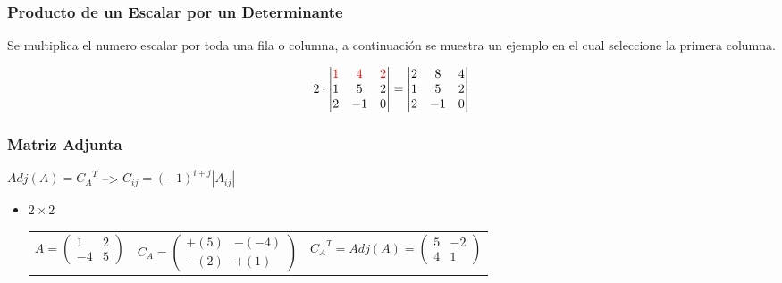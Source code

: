 \documentclass[stu, 12pt, letterpaper, donotrepeattitle, floatsintext, natbib]{apa7}
\begin{document}
\subsubsection{Producto de un Escalar por un Determinante}
Se multiplica el numero escalar por toda una fila o columna, a continuación se muestra un ejemplo en el cual seleccione la primera columna.

\[
2 \cdot
\begin{vmatrix}
  \color{red}1 & \color{red}4 & \color{red}2 \\
  1 & 5 & 2 \\
  2 & -1 & 0 \\
\end{vmatrix}
=
\begin{vmatrix}
  2 & 8 & 4 \\
  1 & 5 & 2 \\
  2 & -1 & 0
\end{vmatrix}
\]
\newpage
\subsubsection{Matriz Adjunta}
${Adj}(A)={C_A}^T$	\qquad \qquad \qquad -->	$C_{ij}=(-1)^{i+j} |A_{ij}|$
\begin{itemize}

\item $2 \times 2$ \\[1cm]
\begin{tabular}{ccc}
$A= \begin{pmatrix} 1 & 2 \\ -4 & 5 \end{pmatrix}$ \quad &
$C_A= \begin{pmatrix} +(5) & -(-4) \\ -(2) & +(1) \end{pmatrix}$ \quad &
${C_A}^T = {Adj}(A)=\begin{pmatrix} 5 & -2 \\ 4 & 1 \end{pmatrix}$
\end{tabular}

\end{itemize}


\newpage
\renewcommand\refname{\large\textbf{Referencias}}

\end{document}
